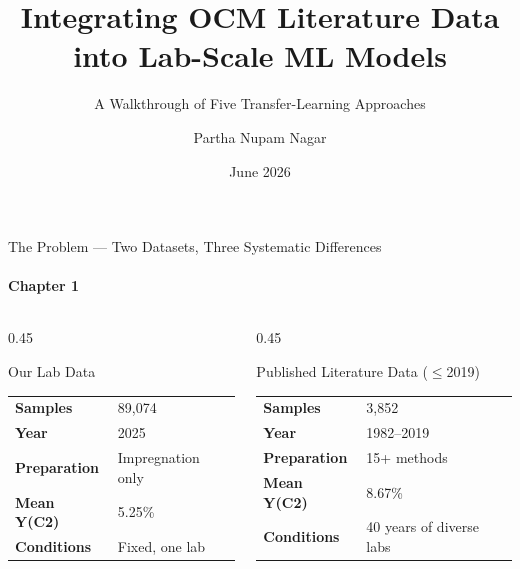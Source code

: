 \documentclass[aspectratio=169,12pt]{beamer}
\title{Integrating OCM Literature Data\\into Lab-Scale ML Models}
\subtitle{A Walkthrough of Five Transfer-Learning Approaches}
\author{Partha Nupam Nagar}
\date{June 2026}
\institute{JAIST — Taniike Lab}
\begin{document}

\begin{frame}[plain]
  \titlepage
\end{frame}

\begin{frame}{The Problem — Two Datasets, Three Systematic Differences}
  \framesubtitle{Chapter 1}

  \begin{columns}[T]

    \begin{column}{0.45\textwidth}
      \begin{block}{Our Lab Data}
        \begin{tabular}{ll}
          \toprule
          \textbf{Samples}     & 89{,}074 \\
          \textbf{Year}        & 2025 \\
          \textbf{Preparation} & Impregnation only \\
          \textbf{Mean Y(C2)}  & 5.25\% \\
          \textbf{Conditions}  & Fixed, one lab \\
          \bottomrule
        \end{tabular}
      \end{block}
    \end{column}

    \begin{column}{0.45\textwidth}
      \begin{block}{Published Literature Data ($\leq$2019)}
        \begin{tabular}{ll}
          \toprule
          \textbf{Samples}     & 3{,}852 \\
          \textbf{Year}        & 1982–2019 \\
          \textbf{Preparation} & 15+ methods \\
          \textbf{Mean Y(C2)}  & 8.67\% \\
          \textbf{Conditions}  & 40 years of diverse labs \\
          \bottomrule
        \end{tabular}
      \end{block}
    \end{column}

  \end{columns}


\end{frame}
\end{document}
